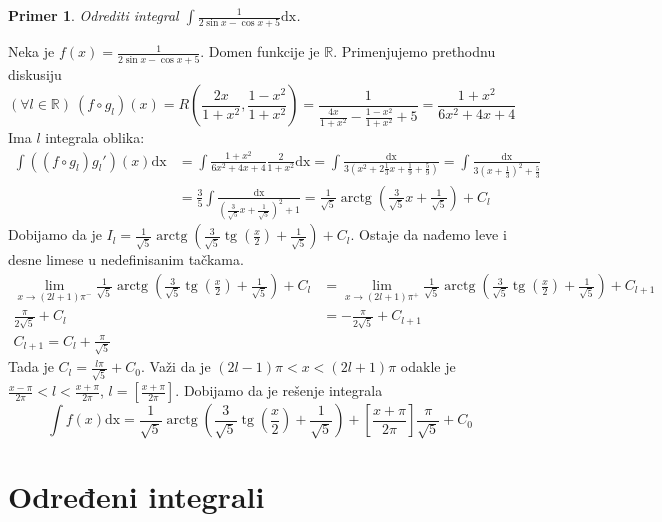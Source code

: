 \documentclass{article}
\newtheorem{prim}{Primer}[section]
\DeclareMathOperator{\tg}{tg}
\DeclareMathOperator{\arctg}{arctg}
\begin{document}
\begin{primbox}
    \begin{prim}
        Odrediti integral $\int\frac{1}{2\sin{x}-\cos{x}+5}\text{dx}$.
    \end{prim}
    Neka je $f(x)=\frac{1}{2\sin{x}-\cos{x}+5}$. Domen funkcije je $\mathbb{R}$. Primenjujemo prethodnu diskusiju
    $$(\forall l\in\mathbb{R})\ (f\circ g_l)(x)=R(\frac{2x}{1+x^2},\frac{1-x^2}{1+x^2})= \frac{1}{\frac{4x}{1+x^2}-\frac{1-x^2}{1+x^2}+5}=\frac{1+x^2}{6x^2+4x+4}$$
    Ima $l$ integrala oblika:
    \begin{align*}
        \int ((f\circ g_l)g_l')(x)\text{dx} & =\int\frac{1+x^2}{6x^2+4x+4}\frac{2}{1+x^2}\text{dx}=\int \frac{\text{dx}}{3(x^2+2\frac{1}{3}x+\frac{1}{9}+\frac{5}{9})}=\int\frac{\text{dx}}{3(x+\frac{1}{3})^2+\frac{5}{3}} \\
                                            & =\frac{3}{5}\int\frac{\text{dx}}{(\frac{3}{\sqrt{5}}x+\frac{1}{\sqrt{5}})^2+1}=\frac{1}{\sqrt{5}}\arctg(\frac{3}{\sqrt{5}}x+\frac{1}{\sqrt{5}})+C_l
    \end{align*}
    Dobijamo da je $I_l =\frac{1}{\sqrt{5}}\arctg(\frac{3}{\sqrt{5}}\tg(\frac{x}{2})+\frac{1}{\sqrt{5}})+C_l$. Ostaje da nađemo leve i desne limese u nedefinisanim tačkama.
    \begin{align*}
        \lim_{x\to (2l+1)\pi^{-}}\frac{1}{\sqrt{5}}\arctg(\frac{3}{\sqrt{5}}\tg(\frac{x}{2})+\frac{1}{\sqrt{5}})+C_l & =\lim_{x\to (2l+1)\pi^{+}}\frac{1}{\sqrt{5}}\arctg(\frac{3}{\sqrt{5}}\tg(\frac{x}{2})+\frac{1}{\sqrt{5}})+C_{l+1} \\
        \frac{\pi}{2\sqrt{5}}+C_l                                                                                    & =-\frac{\pi}{2\sqrt{5}}+C_{l+1}                                                                                   \\
        C_{l+1}=C_l+\frac{\pi}{\sqrt{5}}
    \end{align*}
    Tada je $C_l=\frac{l\pi}{\sqrt{5}}+C_0$. Važi da je $(2l-1)\pi<x<(2l+1)\pi$ odakle je
    $\frac{x-\pi}{2\pi}<l<\frac{x+\pi}{2\pi}$, $l=[\frac{x+\pi}{2\pi}]$.
    Dobijamo da je rešenje integrala
    $$\int f(x)\text{dx}=\frac{1}{\sqrt{5}}\arctg(\frac{3}{\sqrt{5}}\tg(\frac{x}{2})+\frac{1}{\sqrt{5}})+[\frac{x+\pi}{2\pi}]\frac{\pi}{\sqrt{5}}+C_0$$
\end{primbox}

\section{Određeni integrali}
\end{document}
